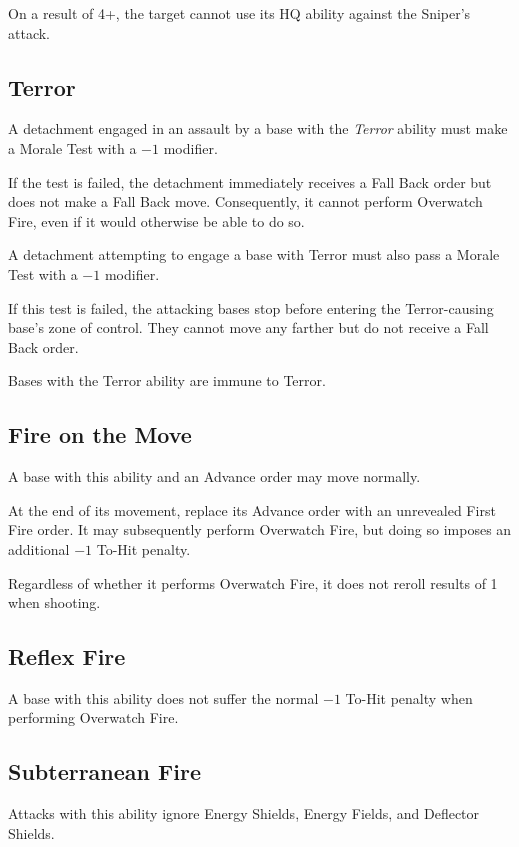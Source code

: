On a result of 4+, the target cannot use its HQ ability against the Sniper's attack.

\subsection{Terror}

A detachment engaged in an assault by a base with the \textit{Terror} ability must make a Morale Test with a $-1$ modifier.

If the test is failed, the detachment immediately receives a Fall Back order but does not make a Fall Back move. Consequently, it cannot perform Overwatch Fire, even if it would otherwise be able to do so.

A detachment attempting to engage a base with Terror must also pass a Morale Test with a $-1$ modifier.

If this test is failed, the attacking bases stop before entering the Terror-causing base's zone of control. They cannot move any farther but do not receive a Fall Back order.

Bases with the Terror ability are immune to Terror.

\subsection{Fire on the Move}

A base with this ability and an Advance order may move normally.

At the end of its movement, replace its Advance order with an unrevealed First Fire order. It may subsequently perform Overwatch Fire, but doing so imposes an additional $-1$ To-Hit penalty.

Regardless of whether it performs Overwatch Fire, it does not reroll results of 1 when shooting.

\subsection{Reflex Fire}

A base with this ability does not suffer the normal $-1$ To-Hit penalty when performing Overwatch Fire.

\subsection{Subterranean Fire}

Attacks with this ability ignore Energy Shields, Energy Fields, and Deflector Shields.

